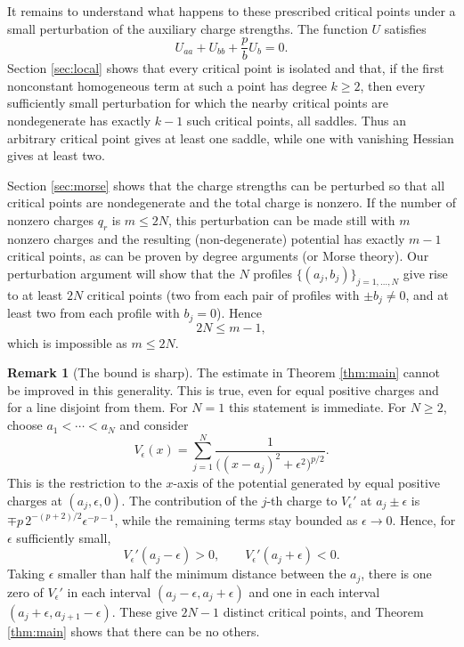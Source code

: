 \documentclass[leqno,11pt]{amsart}
\numberwithin{equation}{section}
\theoremstyle{definition}
\newtheorem{remark}{Remark}
\begin{document}
	It remains to understand what happens to these prescribed critical points under a small perturbation of the auxiliary charge strengths. The function $U$ satisfies
	\begin{equation}\label{eq:weighted-intro}
		U_{aa}+U_{bb}+\frac{p}{b}U_b=0.
	\end{equation}
	Section \ref{sec:local} shows that every critical point is isolated and that, if the first nonconstant homogeneous term at such a point has degree $k\geq2$, then every sufficiently small perturbation for which the nearby critical points are nondegenerate has exactly $k-1$ such critical points, all saddles. Thus an arbitrary critical point gives at least one saddle, while one with vanishing Hessian gives at least two.
	
	Section \ref{sec:morse} shows that the charge strengths can be perturbed so that all critical points are nondegenerate and the total charge is nonzero. If the number of nonzero charges $q_r$ is $m\leq 2N$, this perturbation can be made still with $m$ nonzero charges and the resulting (non-degenerate) potential has exactly $m-1$ critical points, as can be proven by degree arguments (or Morse theory). Our perturbation argument will show that the $N$ profiles $\{(a_j,b_j)\}_{j=1,\ldots , N}$ give rise to at least $2N$ critical points (two from each pair of profiles with $\pm b_j\neq 0$, and at least two from each profile with $b_j=0$). Hence
	\[
	2N\leq m-1,
	\]
	which is impossible as $m \leq 2N$.
	
	
	
	\begin{remark}[The bound is sharp]\label{rem:sharp} The estimate in Theorem \ref{thm:main} cannot be improved in this generality. This is true, even for equal positive charges and for a line disjoint from them. For $N=1$ this statement is immediate. For $N\geq2$, choose $a_1<\cdots<a_N$ and consider
		\[
		V_\epsilon(x)=\sum_{j=1}^N\frac{1}{\big((x-a_j)^2+\epsilon^2\big)^{p/2}}.
		\]
		This is the restriction to the $x$-axis of the potential generated by equal positive charges at $(a_j,\epsilon,0)$. The contribution of the $j$-th charge to $V_\epsilon'$ at $a_j\pm\epsilon$ is $\mp p\,2^{-(p+2)/2}\epsilon^{-p-1}$, while the remaining terms stay bounded as $\epsilon\to0$. Hence, for $\epsilon$ sufficiently small,
		\[
		V_\epsilon'(a_j-\epsilon)>0,
		\qquad
		V_\epsilon'(a_j+\epsilon)<0.
		\]
		Taking $\epsilon$ smaller than half the minimum distance between the $a_j$, there is one zero of $V_\epsilon'$ in each interval $(a_j-\epsilon,a_j+\epsilon)$ and one in each interval $(a_j+\epsilon,a_{j+1}-\epsilon)$. These give $2N-1$ distinct critical points, and Theorem \ref{thm:main} shows that there can be no others.
	\end{remark}
	
\end{document}
